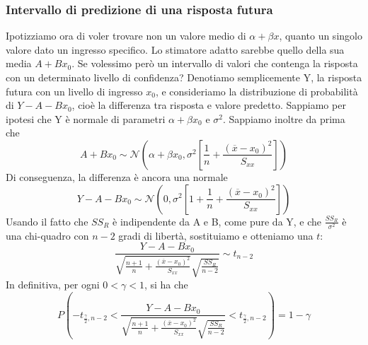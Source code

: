 \documentclass[11pt]{article}
\begin{document}
\subsubsection{Intervallo di predizione di una risposta futura}
Ipotizziamo ora di voler trovare non un valore medio di $\alpha+\beta x$, quanto un singolo valore dato un ingresso specifico. Lo stimatore adatto sarebbe quello della sua media $A+Bx_0$. Se volessimo però un intervallo di valori che contenga la risposta con un determinato livello di confidenza?
Denotiamo semplicemente Y, la risposta futura con un livello di ingresso $x_0$, e consideriamo la distribuzione di probabilità di $Y-A-Bx_0$, cioè la differenza tra risposta e valore predetto. Sappiamo per ipotesi che Y è normale di parametri $\alpha+\beta x_0$ e $\sigma^2$. Sappiamo inoltre da prima che 
\begin{displaymath}
    A+Bx_0 \sim \mathcal{N}\left(\alpha+\beta x_0, \sigma^2\left[\frac{1}{n}+\frac{(\overline{x}-x_0)^2}{S_{xx}}\right]\right)
\end{displaymath}
Di conseguenza, la differenza è ancora una normale
\begin{displaymath}
    Y-A-Bx_0 \sim \mathcal{N}\left(0, \sigma^2\left[1+\frac{1}{n}+\frac{(\overline{x}-x_0)^2}{S_{xx}}\right]\right)
\end{displaymath}
Usando il fatto che $SS_R$ è indipendente da A e B, come pure da Y, e che $\frac{SS_R}{\sigma^2}$ è una chi-quadro con $n-2$ gradi di libertà, sostituiamo e otteniamo una $t$:
\begin{displaymath}
    \frac{Y-A-Bx_0}{\sqrt{\frac{n+1}{n}+\frac{(\overline{x}-x_0)^2}{S_{xx}}}\sqrt{\frac{SS_R}{n-2}}}\sim t_{n-2}
\end{displaymath} 
In definitiva, per ogni $0<\gamma<1$, si ha che
\begin{displaymath}
    P\left(-t_{\frac{\gamma}{2},n-2}  <      \frac{Y-A-Bx_0}{\sqrt{\frac{n+1}{n}+\frac{(\overline{x}-x_0)^2}{S_{xx}}}\sqrt{\frac{SS_R}{n-2}}}  <  t_{\frac{\gamma}{2},n-2}\right) = 1-\gamma
\end{displaymath}
\end{document}
